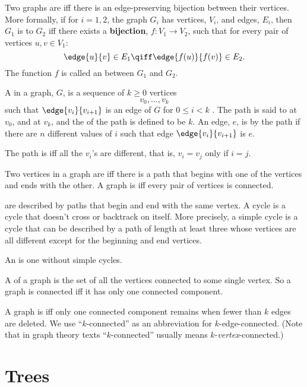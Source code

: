 \documentclass[handout]{mcs}
\begin{document}
Two graphs are  iff there is an edge-preserving bijection
between their vertices.  More formally, if for $i=1,2$, the graph $G_i$ has vertices,
$V_i$, and edges, $E_i$, then $G_1$ is
 to $G_2$ iff there exists a \textbf{bijection}, $f: V_1
\to V_2$, such that for every pair of vertices $u, v \in V_1$:
\[
\edge{u}{v} \in E_1 \qiff \edge{f(u)}{f(v)} \in E_2.
\]
The function $f$ is called an  between $G_1$ and $G_2$.

A  in a graph, $G$, is a sequence of $k \geq 0$ vertices
\[
v_0,\dots,v_k
\]
such that $\edge{v_i}{v_{i+1}}$ is an edge of $G$ for $0 \leq i < k$ .  The
path is said to  at $v_0$, and  at $v_k$,
and the  of the path is defined to be $k$.  An edge, $e$, is
 by the path if there are $n$ different values of
$i$ such that edge $\edge{v_i}{v_{i+1}}$ is $e$.

The path is  iff all the $v_i$'s are different, that is, $v_i
= v_j$ only if $i=j$.

Two vertices in a graph are  iff there is a path that
begins with one of the vertices and ends with the other.  A graph is
 iff every pair of vertices is connected.

\iffalse The \term{shortest} path between two vertices is always simple.\fi

 are described by paths that begin and end with the same
vertex.  A  cycle is a cycle that doesn't cross or backtrack
on itself.  More precisely, a simple cycle is a cycle that can be
described by a path of length at least three whose vertices are all
different except for the beginning and end vertices.

An  is one without simple cycles.

A  of a graph is the set of all the vertices
connected to some single vertex.  So a graph is connected iff it has only
one connected component.

A graph is  iff only one connected component
remains when fewer than $k$ edges are deleted.  We use ``$k$-connected''
as an abbreviation for $k$-edge-connected.  (Note that in graph theory
texts ``$k$-connected'' usually means $k$-\emph{vertex}-connected.)

\section{Trees}
\end{document}

